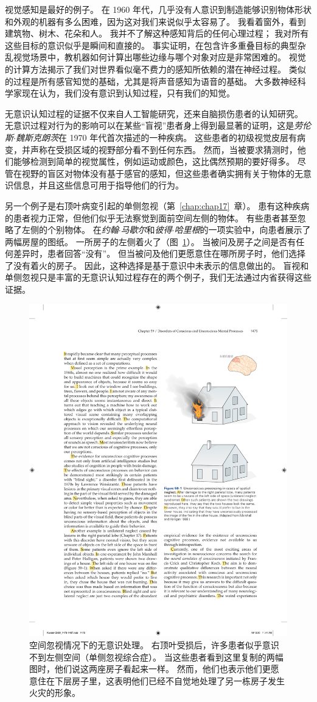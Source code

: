 视觉感知是最好的例子。
在 1960 年代，几乎没有人意识到制造能够识别物体形状和外观的机器有多么困难，因为这对我们来说似乎太容易了。
我看着窗外，看到建筑物、树木、花朵和人。
我并不了解这种感知背后的任何心理过程；
我对所有这些目标的意识似乎是瞬间和直接的。
事实证明，在包含许多重叠目标的典型杂乱视觉场景中，教机器如何计算出哪些边缘与哪个对象对应是非常困难的。
视觉的计算方法揭示了我们对世界看似毫不费力的感知所依赖的潜在神经过程。
类似的过程是所有感官知觉的基础，尤其是将声音感知为语音的基础。
大多数神经科学家现在认为，我们没有意识到认知过程，只有我们的知觉。


无意识认知过程的证据不仅来自人工智能研究，还来自脑损伤患者的认知研究。
无意识过程对行为的影响可以在某些“盲视”患者身上得到最显著的证明，这是\textit{劳伦斯$\cdot$魏斯克朗茨}在 1970 年代首次描述的一种疾病。
这些患者的初级视觉皮层有病变，并声称在受损区域的视野部分看不到任何东西。
然而，当被要求猜测时，他们能够检测到简单的视觉属性，例如运动或颜色，这比偶然预期的要好得多。
尽管在视野的盲区对物体没有基于感官的感知，但这些患者确实拥有关于物体的无意识信息，并且这些信息可用于指导他们的行为。


另一个例子是右顶叶病变引起的单侧忽视（第~\ref{chap:chap17}~章）。
患有这种疾病的患者视力正常，但他们似乎无法察觉到面前空间左侧的物体。
有些患者甚至忽略了左侧的个别物体。
在\textit{约翰$\cdot$马歇尔}和\textit{彼得$\cdot$哈里根}的一项实验中，向患者展示了两幅房屋的图纸。
一所房子的左侧着火了（图~\ref{fig:59_1}）。
当被问及房子之间是否有任何差异时，患者回答“没有”。 但当被问及他们更愿意住在哪所房子时，他们选择了没有着火的房子。
因此，这种选择是基于意识中未表示的信息做出的。
盲视和单侧忽视只是丰富的无意识认知过程存在的两个例子，我们无法通过内省获得这些证据。


\begin{figure}[htbp]
	\centering
	\includegraphics[width=0.63\linewidth]{chap59/fig_59_1}
	\caption{空间忽视情况下的无意识处理。
		右顶叶受损后，许多患者似乎意识不到左侧空间（单侧忽视综合症）。
		当这些患者看到这里复制的两幅图时，他们说这两座房子看起来一样。
		然而，他们也表示他们更愿意住在下层房子里，这表明他们已经不自觉地处理了另一栋房子发生火灾的形象\cite{marshall1988blindsight}。}
	\label{fig:59_1}
\end{figure}


